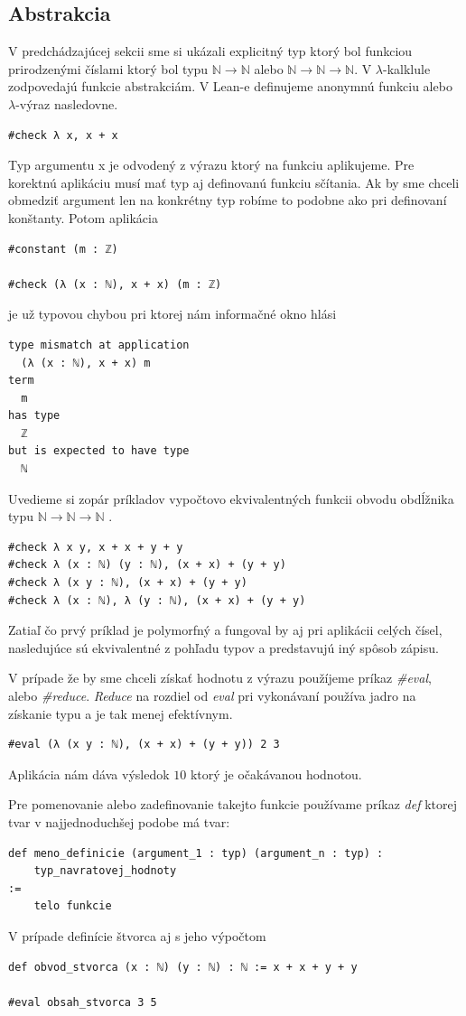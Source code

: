 \documentclass[a4paper,10pt,oneside]{report}%
\begin{document}
\subsection{Abstrakcia}
    V predchádzajúcej sekcii sme si ukázali explicitný typ ktorý bol funkciou prirodzenými
číslami ktorý bol typu $\mathbb{N} \to \mathbb{N}$ alebo $\mathbb{N} \to \mathbb{N} \to \mathbb{N}$.
    V $\lambda$-kalklule zodpovedajú funkcie abstrakciám. V Lean-e definujeme
anonymnú funkciu alebo $\lambda$-výraz nasledovne.
\begin{lstlisting}
#check λ x, x + x
\end{lstlisting}
    Typ argumentu x je odvodený z výrazu ktorý na funkciu aplikujeme.
    Pre korektnú aplikáciu musí mať typ aj definovanú funkciu sčítania.
    Ak by sme chceli obmedziť argument len na konkrétny typ robíme to podobne ako
pri definovaní konštanty. Potom aplikácia
\begin{lstlisting}
#constant (m : ℤ)

#check (λ (x : ℕ), x + x) (m : ℤ)
\end{lstlisting}
je už typovou chybou pri ktorej nám informačné okno hlási
\begin{lstlisting}
type mismatch at application
  (λ (x : ℕ), x + x) m
term
  m
has type
  ℤ
but is expected to have type
  ℕ
\end{lstlisting}
    Uvedieme si zopár príkladov vypočtovo ekvivalentných funkcii obvodu obdĺžnika typu
$\mathbb{N} \to \mathbb{N} \to \mathbb{N}$
.
\begin{lstlisting}
#check λ x y, x + x + y + y
#check λ (x : ℕ) (y : ℕ), (x + x) + (y + y)
#check λ (x y : ℕ), (x + x) + (y + y)
#check λ (x : ℕ), λ (y : ℕ), (x + x) + (y + y)
\end{lstlisting}
    Zatiaľ čo prvý príklad je polymorfný a fungoval by aj pri aplikácii celých čísel,
nasledujúce sú ekvivalentné z pohľadu typov a predstavujú iný spôsob zápisu.

    V prípade že by sme chceli získať hodnotu z výrazu použíjeme príkaz \emph{\#eval},
alebo \emph{\#reduce}. \emph{Reduce} na rozdiel od \emph{eval} pri vykonávaní používa
jadro na získanie typu a je tak menej efektívnym.
\begin{lstlisting}
#eval (λ (x y : ℕ), (x + x) + (y + y)) 2 3
\end{lstlisting}
    Aplikácia nám dáva výsledok $10$ ktorý je očakávanou hodnotou.

    Pre pomenovanie alebo zadefinovanie takejto funkcie používame príkaz \emph{def}
ktorej tvar v najjednoduchšej podobe má tvar:
\begin{lstlisting}
def meno_definicie (argument_1 : typ) (argument_n : typ) :
    typ_navratovej_hodnoty 
:=
    telo funkcie
\end{lstlisting}
V prípade definície štvorca aj s jeho výpočtom
\begin{lstlisting}
def obvod_stvorca (x : ℕ) (y : ℕ) : ℕ := x + x + y + y

#eval obsah_stvorca 3 5
\end{lstlisting}
\end{document}
